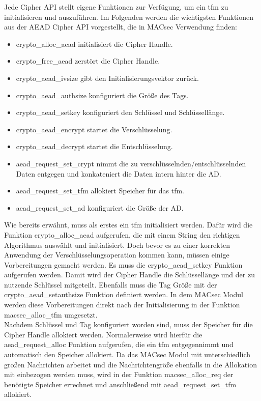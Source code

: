 Jede Cipher API stellt eigene Funktionen zur Verfügung, um ein tfm zu initialisieren und auszuführen. 
Im Folgenden werden die wichtigsten Funktionen aus der AEAD Cipher API vorgestellt, die in MACsec Verwendung finden:
\begin{itemize} 
\item crypto\_alloc\_aead initialisiert die Cipher Handle.
\item crypto\_free\_aead zerstört die Cipher Handle.
\item crypto\_aead\_ivsize gibt den Initialisierungsvektor zurück.
\item crypto\_aead\_authsize konfiguriert die Größe des Tags.
\item crypto\_aead\_setkey konfiguriert den Schlüssel und Schlüssellänge.
\item crypto\_aead\_encrypt startet die Verschlüsselung.
\item crypto\_aead\_decrypt startet die Entschlüsselung.
\item aead\_request\_set\_crypt nimmt die zu verschlüsselnden/entschlüsselnden Daten entgegen und konkateniert die Daten intern hinter die AD.
\item aead\_request\_set\_tfm allokiert Speicher für das tfm.
\item aead\_request\_set\_ad konfiguriert die Größe der AD.
\end{itemize} Wie bereits erwähnt, muss als erstes ein tfm initialisiert werden. Dafür wird die Funktion crypto\_alloc\_aead aufgerufen, die mit einem String den richtigen Algorithmus auswählt und initialisiert. Doch bevor es zu einer korrekten Anwendung der Verschlüsselungsoperation kommen kann, müssen einige Vorbereitungen gemacht werden. Es muss die crypto\_aead\_setkey Funktion aufgerufen werden. Damit wird der Cipher Handle die Schlüssellänge und der zu nutzende Schlüssel mitgeteilt. Ebenfalls muss die Tag Größe mit der crypto\_aead\_setauthsize Funktion definiert werden. In dem MACsec Modul werden diese Vorbereitungen direkt nach der Initialisierung in der Funktion macsec\_alloc\_tfm umgesetzt.\\
Nachdem Schlüssel und Tag konfiguriert worden sind, muss der Speicher für die Cipher Handle allokiert werden. Normalerweise wird hierfür die aead\_request\_alloc Funktion aufgerufen, die ein tfm entgegennimmt und automatisch den Speicher allokiert. Da das MACsec Modul mit unterschiedlich großen Nachrichten arbeitet und die Nachrichtengröße ebenfalls in die Allokation mit einbezogen werden muss, wird in der Funktion macsec\_alloc\_req der benötigte Speicher errechnet und anschließend mit aead\_request\_set\_tfm allokiert. \\
